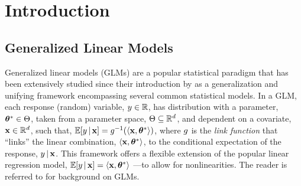 \section{Introduction}
\label{outline:intro}

\subsection{Generalized Linear Models}
\label{outline:intro|>glm}

Generalized linear models (GLMs) are a popular statistical paradigm that has been extensively studied since their introduction by \cite{nelder1972generalized} as a generalization
and unifying framework encompassing several
common
statistical models.
In a GLM, each response (random) variable, \(  \RespV* \in \R \), has distribution with a parameter, \(  \thetaStar \in \ParamSpace  \), taken from a parameter space, \(  \Theta \subseteq \mathbb{R}^{d}  \), and dependent on a covariate, \(  \CovV  \in \R^{\n} \), such that,
\(  \E[\RespV* \Mid| \CovV] = \linkFn^{-1}( \langle \CovV, \thetaStar \rangle )  \),
where \(  g  \) is the \emph{link function} that ``links'' the linear combination, \(  \langle \CovV, \thetaStar \rangle  \), to the conditional expectation of the response, \(  \RespV* \Mid| \CovV  \).
This
framework
offers a flexible extension of the popular linear regression model, %
\(  \E[\RespV* \Mid| \CovV] = \langle \CovV, \thetaStar \rangle  \)
---to allow for nonlinearities.
The reader is referred to \cite{mccullagh2019generalized,dobson2018introduction,fahrmeir1994multivariate,hardin2007generalized} for background on GLMs.

